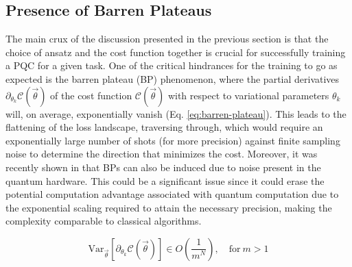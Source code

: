 \subsection{Presence of Barren Plateaus}

The main crux of the discussion presented in the previous section is that the choice of ansatz and the cost function together is crucial for successfully training a PQC for a given task. One of the critical hindrances for the training to go as expected is the barren plateau (BP) phenomenon, where the partial derivatives $\partial_{\theta_k}\mathcal{C}(\vec{\theta})$ of the cost function $\mathcal{C}(\vec{\theta})$ with respect to variational parameters $\theta_k$ will, on average, exponentially vanish (Eq. \ref{eq:barren-plateau}). This leads to the flattening of the loss landscape, traversing through, which would require an exponentially large number of shots (for more precision) against finite sampling noise to determine the direction that minimizes the cost. Moreover, it was recently shown in \cite{2020arXiv200714384W} that BPs can also be induced due to noise present in the quantum hardware. This could be a significant issue since it could erase the potential computation advantage associated with quantum computation due to the exponential scaling required to attain the necessary precision, making the complexity comparable to classical algorithms.

\begin{equation}\label{eq:barren-plateau}
	\text{Var}_{\vec{\theta}}[\partial_{\theta_k}\mathcal{C}(\vec{\theta})] \in O\left(\frac{1}{m^N}\right),\quad \text{for}\ m > 1
\end{equation}

